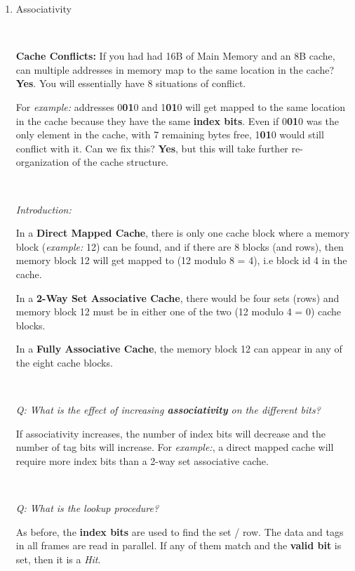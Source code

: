 \documentclass[12pt]{article}
\newenvironment{QandA}{\begin{enumerate}[label=\bfseries\arabic*.]\bfseries}
                      {\end{enumerate}}
\newenvironment{answered}{\par\quad\normalfont}{}
\begin{document}
\begin{QandA}
\begin{answered}
\end{answered}

\item Associativity

\ 

\begin{answered}
\textbf{Cache Conflicts:} If you had had 16B of Main Memory and an 8B cache, can multiple addresses in memory map to the same location in the cache? \textbf{Yes}. You will essentially have 8 situations of conflict.

For \textit{example:} addresses 0\textbf{01}0 and 1\textbf{01}0 will get mapped to the same location in the cache because they have the same \textbf{index bits}. Even if 0\textbf{01}0 was the only element in the cache, with 7 remaining bytes free, 1\textbf{01}0 would still conflict with it. Can we fix this? \textbf{Yes}, but this will take further re-organization of the cache structure.

\ 

\textit{Introduction:}

In a \textbf{Direct Mapped Cache}, there is only one cache block where a memory block (\textit{example:} 12) can be found, and if there are 8 blocks (and rows), then memory block 12 will get mapped to (12 modulo 8 = 4), i.e block id 4 in the cache. 

In a \textbf{2-Way Set Associative Cache}, there would be four sets (rows) and memory block 12 must be in either one of the two (12 modulo 4 = 0) cache blocks. 

In a \textbf{Fully Associative Cache}, the memory block 12 can appear in any of the eight cache blocks. 

\

\textit{Q: What is the effect of increasing \textbf{associativity} on the different bits?}

\quad If associativity increases, the number of index bits will decrease and the number of tag bits will increase. For \textit{example:}, a direct mapped cache will require more index bits than a 2-way set associative cache. 

\ 

\textit{Q: What is the lookup procedure?}

\quad As before, the \textbf{index bits} are used to find the set / row. The data and tags in all frames are read in parallel. If any of them match and the \textbf{valid bit} is set, then it is a \textit{Hit}. 

\

\newpage 


\end{answered}
\end{QandA}
\end{document}
